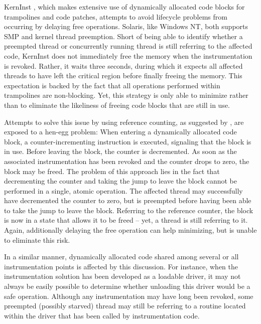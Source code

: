 KernInst \cite{tamches99finegrained}, which makes extensive use of dynamically allocated code blocks for trampolines
and code patches, attempts to avoid lifecycle problems from occurring by delaying free operations. 
Solaris, like Windows NT, both supports SMP and kernel thread preemption. Short of 
being able to identify whether a preempted thread or concurrently running thread is still referring
to the affected code, KernInst does not immediately free the memory when the instrumentation
is revoked. Rather, it waits three seconds, during which it expects all affected threads
to have left the critical region before finally freeing the memory. This expectation is backed
by the fact that all operations performed within trampolines are non-blocking.
Yet, this strategy is only able to minimize rather than to eliminate the likeliness
of freeing code blocks that are still in use.

Attempts to solve this issue by using reference counting, as suggested by 
\cite{Tamches01}, are exposed to a hen-egg problem: When entering a dynamically
allocated code block, a counter-incrementing instruction is executed, signaling
that the block is in use. Before leaving the block, the counter is decremented. As soon
as the associated instrumentation has been revoked and the counter drops to zero, the block may be 
freed. The problem of this approach lies in the fact that decrementing the counter and 
taking the jump to leave the block cannot be performed in a single, atomic operation. 
The affected thread may successfully have decremented the counter to zero, 
but is preempted before having been able to take the jump to leave the block. 
Referring to the reference counter, the block is now in a state that allows
it to be freed -- yet, a thread is still referring to it. Again, additionally delaying the free 
operation can help minimizing, but is unable to eliminate this risk.

In a similar manner, dynamically allocated code shared among several or all 
instrumentation points is affected by this discussion. For instance, when the instrumentation
solution has been developed as a loadable driver, it may not always be easily possible to 
determine whether unloading this driver would be a safe operation. Although any
instrumentation may have long been revoked, some preempted (possibly starved) thread may still 
be referring to a routine located within the driver that has been called by 
instrumentation code.




